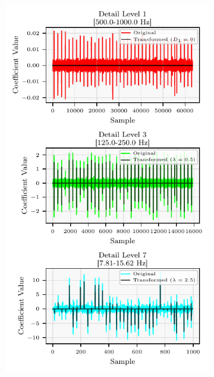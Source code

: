 \documentclass{report}
\begin{document}
            \begin{figure}[H]
                \centering
                 \begin{subfigure}[b]{0.4\textwidth}
                    \includegraphics[width=\textwidth, height=0.47\textheight, keepaspectratio]{plots/chapter_3/mea_sft_wavelet_details_selected.pdf}
                    \caption[Field Potential DWT-based denoising strategy]{}

\end{subfigure}
\end{figure}
\end{document}
